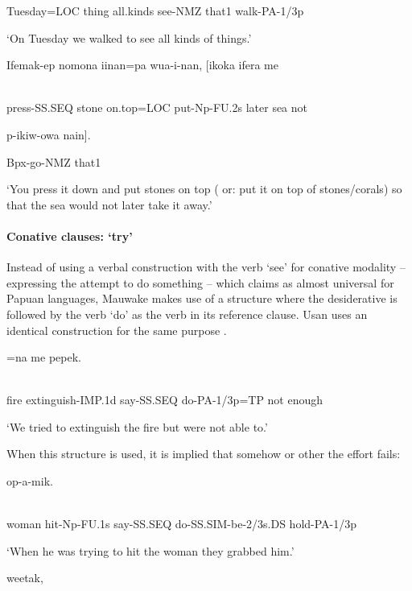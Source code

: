 Tuesday=LOC  thing  all.kinds  see-NMZ  that1  walk-PA-1/3p

`On Tuesday we walked to see all kinds of things.'

\ea%
\label{ex:x1634}
\gll Ifemak-ep  nomona  iinan=pa  wua-i-nan,  [ikoka  ifera  me  \\
      \\
\glt
\z

press-SS.SEQ  stone  on.top=LOC  put-Np-FU.2s  later  sea  not

p-ikiw-owa  nain].

Bpx-go-NMZ  that1

`You press it down and put stones on top ( or: put it on top of stones/corals) so that the sea would not later take it away.'

\paragraph[Conative clauses: `try' ]{Conative clauses: `try'} 
\hypertarget{RefHeading23521935131865}{}
Instead of using a verbal construction with the verb `see' for conative modality -- expressing the attempt to do something -- which \citet[152]{Foley1986} claims as almost universal for Papuan languages, Mauwake makes use of a structure where the desiderative is followed by the verb  `do' as the verb in its reference clause. Usan uses an identical construction for the same purpose \citep[258]{Reesink1987}. 

\ea%
\label{ex:x373}
=na  me  pepek. \\
      \\
\glt
\z

fire  extinguish-IMP.1d  say-SS.SEQ  do-PA-1/3p=TP  not  enough

`We tried to extinguish the fire but were not able to.'

When this structure is used, it is implied that somehow or other the effort fails:

\ea%
\label{ex:x374}
  op-a-mik. \\
      \\
\glt
\z

woman  hit-Np-FU.1s  say-SS.SEQ  do-SS.SIM-be-2/3s.DS  hold-PA-1/3p

`When he was trying to hit the woman they grabbed him.'

\ea%
\label{ex:x1606}
  weetak, \\
      \\
\glt
\z

